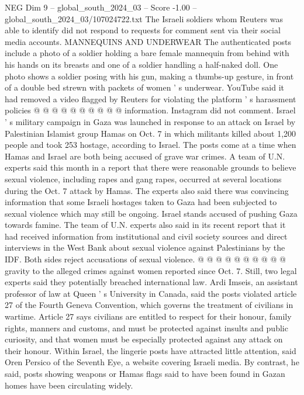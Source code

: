 \begin{textsample}{NEG Dim 9 – global\_south\_2024\_03 – Score -1.00 – global\_south\_2024\_03/107024722.txt}
The Israeli soldiers whom Reuters was able to identify did not respond to requests for comment sent via their social media accounts.
MANNEQUINS AND UNDERWEAR The authenticated posts include a photo of a soldier holding a bare female mannequin from behind with his hands on its breasts and one of a soldier handling a half-naked doll.
One photo shows a soldier posing with his gun, making a thumbs-up gesture, in front of a double bed strewn with packets of women ' s underwear.
YouTube said it had removed a video flagged by Reuters for violating the platform ' s harassment policies @ @ @ @ @ @ @ @ @ @ information.
Instagram did not comment.
Israel ' s military campaign in Gaza was launched in response to an attack on Israel by Palestinian Islamist group Hamas on Oct. 7 in which militants killed about 1,200 people and took 253 hostage, according to Israel.
The posts come at a time when Hamas and Israel are both being accused of grave war crimes.
A team of U.N. experts said this month in a report that there were reasonable grounds to believe sexual violence, including rapes and gang rapes, occurred at several locations during the Oct. 7 attack by Hamas.
The experts also said there was convincing information that some Israeli hostages taken to Gaza had been subjected to sexual violence which may still be ongoing.
Israel stands accused of pushing Gaza towards famine.
The team of U.N. experts also said in its recent report that it had received information from institutional and civil society sources and direct interviews in the West Bank about sexual violence against Palestinians by the IDF.
Both sides reject accusations of sexual violence. @ @ @ @ @ @ @ @ @ @ gravity to the alleged crimes against women reported since Oct. 7.
Still, two legal experts said they potentially breached international law.
Ardi Imseis, an assistant professor of law at Queen ' s University in Canada, said the posts violated article 27 of the Fourth Geneva Convention, which governs the treatment of civilians in wartime.
Article 27 says civilians are entitled to respect for their honour, family rights, manners and customs, and must be protected against insults and public curiosity, and that women must be especially protected against any attack on their honour.
Within Israel, the lingerie posts have attracted little attention, said Oren Persico of the Seventh Eye, a website covering Israeli media.
By contrast, he said, posts showing weapons or Hamas flags said to have been found in Gazan homes have been circulating widely.

\end{textsample}
